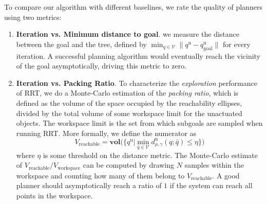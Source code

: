 To compare our algorithm with different baselines, we rate the quality of planners using two metrics:
\begin{enumerate}
    \item {\bf Iteration vs. Minimum distance to goal}.  we measure the distance between the goal and the tree, defined by $\min_{q\in\mathcal{V}} \|q^\mathrm{u} - q_\textrm{goal}^\mathrm{u}\|$ for every iteration. A successful planning algorithm would eventually reach the vicinity of the goal asymptotically, driving this metric to zero. 
    \item {\bf Iteration vs. Packing Ratio}. To characterize the \emph{exploration} performance of RRT, we do a Monte-Carlo estimation of the \emph{packing ratio}, which is defined as the volume of the space occupied by the reachability ellipses, divided by the total volume of some workspace limit for the unactuated objects. The workspace limit is the set from which subgoals are sampled when running RRT. More formally, we define the numerator as
    \begin{equation}
        V_{\mathrm{reachable}} = \textbf{vol}\big(\{q^\mathrm{u} | \min_{\bar{q}\in\mathcal{V}} d^\mathrm{u}_{\rho,\gamma}(q; \bar{q}) \leq \eta\}\big)
    \end{equation}
    where $\eta$ is some threshold on the distance metric. The Monte-Carlo estimate of $V_{\mathrm{reachable}}/V_{\mathrm{workspace}}$ can be computed by drawing $N$ samples within the workspace and counting how many of them belong to $V_{\mathrm{reachable}}$. A good planner should asymptotically reach a ratio of $1$ if the system can reach all points in the workspace.
\end{enumerate}

